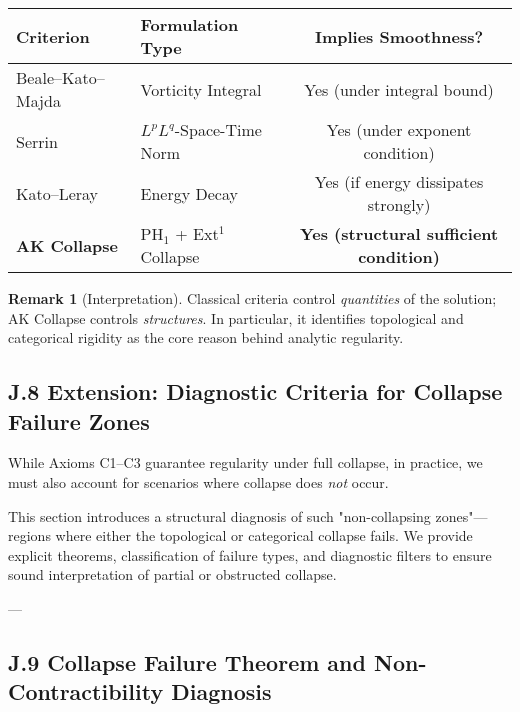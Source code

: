 \documentclass[11pt]{article}
\theoremstyle{definition}
\newtheorem{remark}[theorem]{Remark}
\begin{document}
\begin{center}
\renewcommand{\arraystretch}{1.4}
\begin{tabular}{|l|l|c|}
\hline
\textbf{Criterion} & \textbf{Formulation Type} & \textbf{Implies Smoothness?} \\
\hline
Beale--Kato--Majda & Vorticity Integral & Yes (under integral bound) \\
Serrin & \( L^pL^q \)-Space-Time Norm & Yes (under exponent condition) \\
Kato--Leray & Energy Decay & Yes (if energy dissipates strongly) \\
\hline
\textbf{AK Collapse} & PH$_1$ + Ext$^1$ Collapse & \textbf{Yes (structural sufficient condition)} \\
\hline
\end{tabular}
\end{center}

\begin{remark}[Interpretation]
Classical criteria control \emph{quantities} of the solution; AK Collapse controls \emph{structures}.  
In particular, it identifies topological and categorical rigidity as the core reason behind analytic regularity.
\end{remark}

\subsection*{J.8 Extension: Diagnostic Criteria for Collapse Failure Zones}

While Axioms C1–C3 guarantee regularity under full collapse,  
in practice, we must also account for scenarios where collapse does \emph{not} occur.

This section introduces a structural diagnosis of such "non-collapsing zones"—regions where either the topological or categorical collapse fails.  
We provide explicit theorems, classification of failure types, and diagnostic filters to ensure sound interpretation of partial or obstructed collapse.

---

\subsection*{J.9 Collapse Failure Theorem and Non-Contractibility Diagnosis}
\end{document}
